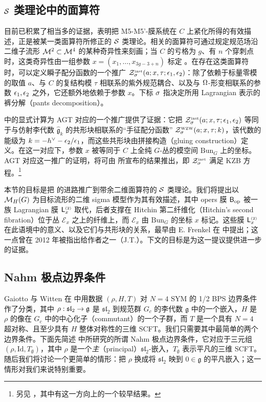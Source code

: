 \subsection{$\mathcal{S}$ 类理论中的面算符}

目前已积累了相当多的证据，表明把 M5-M5'-膜系统在 $C$ 上紧化所得的有效描述，正是被某一类面算符所修正的 $\mathcal{S}$ 类理论。相关的面算符可通过规定规范场沿二维子流形 $\mathcal{M}^2\subset\mathcal{M}^4$ 的某种奇异性来刻画；当 $C$ 的亏格为 $g$、有 $n$ 个穿刺点时，这类奇异性由一组参数 $x=(x_1,\dots,x_{3g-3+n})$ 标定 \cite{AT,FGT}。在存在这类面算符时，可以定义瞬子配分函数的一个推广 $\mathcal{Z}^{\rm\scriptscriptstyle inst}_\sigma(a;x,\tau;\epsilon_1,\epsilon_2)$：除了依赖于标量零模的取值 $a$、与 $C$ 的复结构模 $\tau$ 相联系的紫外规范耦合、以及与 $\Omega$-形变相联系的参数 $\epsilon_1,\epsilon_2$ 之外，它还额外地依赖于参数 $x$。下标 $\sigma$ 指决定所用 Lagrangian 表示的裤分解（pants decomposition）。

\cite{Br,AT,KPPW,Ne,Na} 中的显式计算为 AGT 对应的一个推广提供了证据：它把 $\mathcal{Z}^{\rm\scriptscriptstyle inst}_{\sigma}(a;x,\tau;\epsilon_1,\epsilon_2)$ 等同于与仿射李代数 $\hat{\mathfrak{g}}_k$ 的共形块相联系的“手征配分函数” $\mathcal{Z}^{\rm\scriptscriptstyle WZW}_{\sigma}(a;x,\tau;k)$，该代数的能级为 $k=-h^{\vee}-\epsilon_2/\epsilon_1$，而这些共形块由拼接构造（gluing construction）定义。在这一对应下，参数 $x$ 被等同于 $C$ 上全纯 $G$-丛的模空间 $\mathrm{Bun}_G$ 上的坐标。AGT 对应这一推广的证明，将可由 \cite{N15} 所宣布的结果推出，即 $\mathcal{Z}^{\rm\scriptscriptstyle inst}_\sigma$ 满足 KZB 方程。\footnote{
另见 {\cite{Ne}}，其中有这一方向上的一个较早结果。}

本节的目标是把 \cite{NW,GW} 的进路推广到带余二维面算符的 $\mathcal{S}$ 类理论。我们将提出以 $\mathcal{M}_H(G)$ 为目标流形的二维 sigma 模型作为其有效描述，其中 opers 膜 $\mathsf{B}_{\rm op}$ 被一族 Lagrangian 膜 $\mathsf{L}_{x}^{\scriptscriptstyle (2)}$ 取代，后者支撑在 Hitchin 第二纤维化（Hitchin's second fibration）位于丛 $\mathcal{E}_x$ 之上的纤维上，而 $\mathcal{E}_x$ 由 $\mathrm{Bun}_G$ 的坐标 $x$ 标记。这些膜 $\mathsf{L}_{x}^{\scriptscriptstyle (2)}$ 在此语境中的意义、以及它们与共形块的关系，最早由 E. Frenkel 在 \cite{Fr10} 中提出；这一点曾在 2012 年被指出给作者之一（J.T.）。下文的目标是为这一提议提供进一步的证据。

\subsection{Nahm 极点边界条件}\label{S:Nahm}

Gaiotto 与 Witten 在 \cite{GW1} 中用数据 $(\rho,H,T)$ 对 $N=4$ SYM 的 1/2 BPS 边界条件作了分类，其中 $\rho:\mathfrak{sl}_2\to \mathfrak{g}$ 是 $\mathfrak{sl}_2$ 到规范群 $G_c$ 的李代数 $\mathfrak{g}$ 中的一个嵌入，$H$ 是 $\rho$ 的像在 $G_c$ 中的中心化子（commutant）的一个子群，而 $T$ 是一个具有 $N=4$ 超对称、且至少具有 $H$ 整体对称性的三维 SCFT。我们只需要其中最简单的两个边界条件。下面先简述 \cite{GW} 中所研究的所谓 Nahm 极点边界条件，它对应于三元组 $(\rho,\mathrm{Id},T_\emptyset)$，其中 $\rho$ 是一个\emph{主}（principal）$\mathfrak{sl}_2$-嵌入，$T_\emptyset$ 表示平凡的三维 SCFT。随后我们将讨论一个更简单的情形：把 $\rho$ 换成将 $\mathfrak{sl}_2$ 映到 $0\in\mathfrak{g}$ 的平凡嵌入；这一情形对我们来说特别重要。

